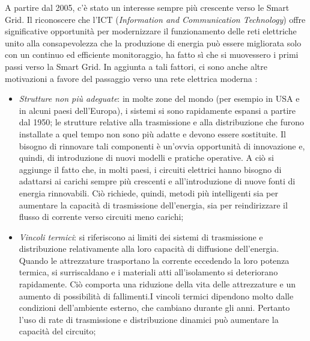 A partire dal 2005, c'è stato un interesse sempre più crescente verso le Smart Grid. Il riconoscere che l'ICT (\textit{Information and Communication Technology}) offre significative opportunità per modernizzare il funzionamento delle reti elettriche unito alla consapevolezza che la produzione di energia può essere migliorata solo con un continuo ed efficiente monitoraggio, ha fatto sì che si muovessero i primi passi verso la Smart Grid. In aggiunta a tali fattori, ci sono anche altre motivazioni a favore del passaggio verso una rete elettrica moderna \cite{smartgrid}:
\begin{itemize}
\item \textit{Strutture non più adeguate}: in molte zone del mondo (per esempio in USA e in alcuni paesi dell'Europa), i sistemi si sono rapidamente espansi a partire dal 1950; le strutture relative alla trasmissione e alla distribuzione che furono installate a quel tempo non sono più adatte e devono essere sostituite. Il bisogno di rinnovare tali componenti è un'ovvia opportunità di innovazione e, quindi, di introduzione di nuovi modelli e pratiche operative. A ciò si aggiunge il fatto che, in molti paesi, i circuiti elettrici hanno bisogno di adattarsi ai carichi sempre più crescenti e all'introduzione di nuove fonti di energia rinnovabili. Ciò richiede, quindi, metodi più intelligenti sia per aumentare la capacità di trasmissione dell'energia, sia per reindirizzare il flusso di corrente verso circuiti meno carichi;

\item \textit{Vincoli termici}: si riferiscono ai limiti dei sistemi di trasmissione e distribuzione relativamente alla loro capacità di diffusione dell'energia. Quando le attrezzature trasportano la corrente eccedendo la loro potenza termica, si surriscaldano e i materiali atti all'isolamento si deteriorano rapidamente. Ciò comporta una riduzione della vita delle attrezzature e un aumento di possibilità di fallimenti.\newline I vincoli termici dipendono molto dalle condizioni dell'ambiente esterno, che cambiano durante gli anni. Pertanto l'uso di rate di trasmissione e distribuzione dinamici può aumentare la capacità del circuito;


\end{itemize}
